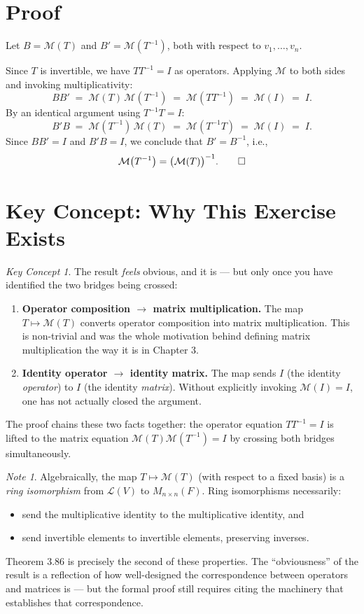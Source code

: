\documentclass[12pt]{article}
\theoremstyle{definition}
\theoremstyle{remark}
\newtheorem*{remark}{Key Concept}
\newtheorem*{note}{Note}
\newcommand{\M}[1]{\mathcal{M}\!\left(#1\right)}
\begin{document}
\section*{Proof}
 
Let $B = \M{T}$ and $B' = \M{T^{-1}}$, both with respect to $v_1, \ldots, v_n$.
 
Since $T$ is invertible, we have $TT^{-1} = I$ as operators. Applying
$\mathcal{M}$ to both sides and invoking multiplicativity:
\[
    BB' \;=\; \M{T}\,\M{T^{-1}} \;=\; \M{TT^{-1}} \;=\; \M{I} \;=\; I.
\]
By an identical argument using $T^{-1}T = I$:
\[
    B'B \;=\; \M{T^{-1}}\,\M{T} \;=\; \M{T^{-1}T} \;=\; \M{I} \;=\; I.
\]
Since $BB' = I$ and $B'B = I$, we conclude that $B' = B^{-1}$, i.e.,
\[
    \M{T^{-1}} = \bigl(\M{T}\bigr)^{-1}. \qed
\]
 
\section*{Key Concept: Why This Exercise Exists}
 
\begin{remark}
The result \emph{feels} obvious, and it is --- but only once you have
identified the two bridges being crossed:
 
\begin{enumerate}
    \item \textbf{Operator composition $\longrightarrow$ matrix multiplication.}
          The map $T \mapsto \mathcal{M}(T)$ converts operator composition into
          matrix multiplication. This is non-trivial and was the whole motivation
          behind defining matrix multiplication the way it is in Chapter 3.
 
    \item \textbf{Identity operator $\longrightarrow$ identity matrix.}
          The map sends $I$ (the identity \emph{operator}) to $I$ (the identity
          \emph{matrix}). Without explicitly invoking $\M{I} = I$, one has not
          actually closed the argument.
\end{enumerate}
 
The proof chains these two facts together: the operator equation $TT^{-1} = I$
is lifted to the matrix equation $\M{T}\M{T^{-1}} = I$ by crossing both bridges
simultaneously.
\end{remark}
 
\begin{note}
Algebraically, the map $T \mapsto \mathcal{M}(T)$ (with respect to a fixed
basis) is a \emph{ring isomorphism} from $\mathcal{L}(V)$ to $M_{n \times n}(F)$.
Ring isomorphisms necessarily:
\begin{itemize}
    \item send the multiplicative identity to the multiplicative identity, and
    \item send invertible elements to invertible elements, preserving inverses.
\end{itemize}
Theorem 3.86 is precisely the second of these properties. The ``obviousness''
of the result is a reflection of how well-designed the correspondence between
operators and matrices is --- but the formal proof still requires citing the
machinery that establishes that correspondence.
\end{note}
 
\end{document}

